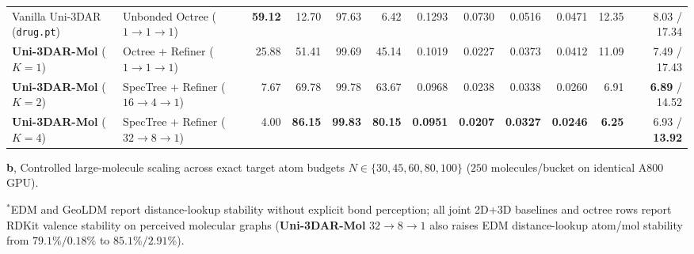 \documentclass[11pt,a4paper]{article}
\begin{document}
\begin{table}[!t]
{\begin{tabular}{@{}llrrrrrrrrrr@{}}
    \midrule
    Vanilla Uni-3DAR (\texttt{drug.pt}) & Unbonded Octree ($1\to 1\to 1$) & \textbf{59.12} & 12.70 & 97.63 & 6.42 & 0.1293 & 0.0730 & 0.0516 & 0.0471 & 12.35 & 8.03 / 17.34 \\
    \textbf{Uni-3DAR-Mol} ($K=1$) & Octree + Refiner ($1\to 1\to 1$) & 25.88 & 51.41 & 99.69 & 45.14 & 0.1019 & 0.0227 & 0.0373 & 0.0412 & 11.09 & 7.49 / 17.43 \\
    \textbf{Uni-3DAR-Mol} ($K=2$) & SpecTree + Refiner ($16\to 4\to 1$) & 7.67 & 69.78 & 99.78 & 63.67 & 0.0968 & 0.0238 & 0.0338 & 0.0260 & 6.91 & \textbf{6.89} / 14.52 \\
    \textbf{Uni-3DAR-Mol} ($K=4$) & SpecTree + Refiner ($32\to 8\to 1$) & 4.00 & \textbf{86.15} & \textbf{99.83} & \textbf{80.15} & \textbf{0.0951} & \textbf{0.0207} & \textbf{0.0327} & \textbf{0.0246} & \textbf{6.25} & 6.93 / \textbf{13.92} \\
    \bottomrule
  \end{tabular}%
  }

  \vspace{5pt}
  \textbf{b}, Controlled large-molecule scaling across exact target atom budgets $N \in \{30, 45, 60, 80, 100\}$ ($250$ molecules/bucket on identical A800 GPU).\\[2pt]
  \vspace{2pt}\par{\scriptsize $^*$EDM and GeoLDM report distance-lookup stability without explicit bond perception; all joint 2D+3D baselines and octree rows report RDKit valence stability on perceived molecular graphs (\textbf{Uni-3DAR-Mol} $32\to 8\to 1$ also raises EDM distance-lookup atom/mol stability from $79.1\%/0.18\%$ to $85.1\%/2.91\%$).}
\end{table}
\end{document}
